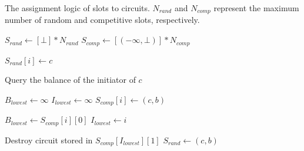\begin{algorithm}[!t]
	\label{alg:slot_logic}
	\caption{The assignment logic of slots to circuits. $ N_{rand} $ and $ N_{comp} $ represent the maximum number of random and competitive slots, respectively.}
	\begin{algorithmic}[1]
		\State $ S_{rand} \leftarrow [\bot] * N_{rand} $ 
		\State $ S_{comp} \leftarrow [(-\infty, \bot)] * N_{comp} $ 
		\State
		
		\State $ S_{rand}[i] \leftarrow c $
		\State \Return
		\EndIf
		\EndFor
		
		\State Query the balance of the initiator of $ c $
		
		\EndFunction
		\State
		
		\State $ B_{lowest} \leftarrow \infty $
		\State $ I_{lowest} \leftarrow \infty $
		 
		\State $ S_{comp}[i] \leftarrow (c,b) $
		\State \Return
		\EndIf
		
		\State $ B_{lowest} \leftarrow S_{comp}[i][0] $
		\State $ I_{lowest} \leftarrow i $
		\EndIf
		\EndFor
		
		\State Destroy circuit stored in $ S_{comp}[I_{lowest}][1] $
		\State $ S_{rand} \leftarrow (c, b) $
		\EndIf
		
		\EndFunction
		
	\end{algorithmic}
\end{algorithm}

